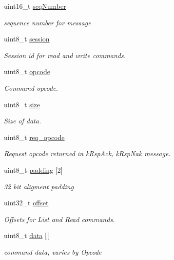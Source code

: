 \begin{DoxyCompactItemize}
\item 
uint16\+\_\+t \mbox{\hyperlink{group__plugin_ga0bde534b62af463e4deeba5c0810dc9f}{seq\+Number}}
\begin{DoxyCompactList}\small\item\em sequence number for message \end{DoxyCompactList}\item 
uint8\+\_\+t \mbox{\hyperlink{group__plugin_ga1209ac70809aacaac73c8213101abee0}{session}}
\begin{DoxyCompactList}\small\item\em Session id for read and write commands. \end{DoxyCompactList}\item 
uint8\+\_\+t \mbox{\hyperlink{group__plugin_ga340cfea8909b60e37e878965187fc278}{opcode}}
\begin{DoxyCompactList}\small\item\em Command opcode. \end{DoxyCompactList}\item 
uint8\+\_\+t \mbox{\hyperlink{group__plugin_gaadeefe030ed0876e8f2d9d5a8b31eec8}{size}}
\begin{DoxyCompactList}\small\item\em Size of data. \end{DoxyCompactList}\item 
uint8\+\_\+t \mbox{\hyperlink{group__plugin_gabaad85a3fcad787b3090475a09c9a0d2}{req\+\_\+opcode}}
\begin{DoxyCompactList}\small\item\em Request opcode returned in k\+Rsp\+Ack, k\+Rsp\+Nak message. \end{DoxyCompactList}\item 
uint8\+\_\+t \mbox{\hyperlink{group__plugin_ga25e7938240c0066274c19308b8dbbf9a}{padding}} \mbox{[}2\mbox{]}
\begin{DoxyCompactList}\small\item\em 32 bit aligment padding \end{DoxyCompactList}\item 
uint32\+\_\+t \mbox{\hyperlink{group__plugin_gad3b592e2842b6992de35f68befe7b068}{offset}}
\begin{DoxyCompactList}\small\item\em Offsets for List and Read commands. \end{DoxyCompactList}\item 
uint8\+\_\+t \mbox{\hyperlink{group__plugin_gafd17454ffa66cafc1bf7b4a8d4b82961}{data}} \mbox{[}$\,$\mbox{]}
\begin{DoxyCompactList}\small\item\em command data, varies by Opcode \end{DoxyCompactList}\end{DoxyCompactItemize}


